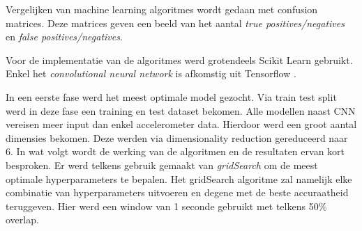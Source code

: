 Vergelijken van machine learning algoritmes wordt gedaan met confusion matrices. Deze matrices geven een beeld van het aantal \textit{true positives/negatives} en \textit{false positives/negatives}. 

Voor de implementatie van de algoritmes werd grotendeels Scikit Learn gebruikt. Enkel het \textit{convolutional neural network} is afkomstig uit Tensorflow \citep{ref3} \cite{ref29} \cite{ref30}.

In een eerste fase werd het meest optimale model gezocht. Via train test split werd in deze fase een training en test dataset bekomen. Alle modellen naast CNN vereisen meer input dan enkel accelerometer data. Hierdoor werd een groot aantal dimensies bekomen. Deze werden via dimensionality reduction gereduceerd naar 6. In wat volgt wordt de werking van de algoritmen en de resultaten ervan kort besproken. Er werd telkens gebruik gemaakt van \textit{gridSearch} om de meest optimale hyperparameters te bepalen. Het gridSearch algoritme zal namelijk elke combinatie van hyperparameters uitvoeren en degene met de beste accuraatheid teruggeven. Hier werd een window van 1 seconde gebruikt met telkens 50\% overlap.


